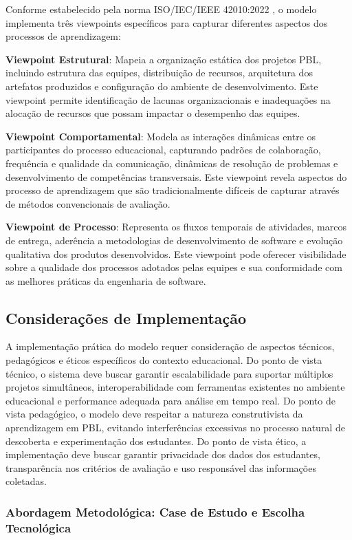 \documentclass[12pt,a4paper]{article}
\begin{document}
Conforme estabelecido pela norma ISO/IEC/IEEE 42010:2022 \cite{iso42010}, o modelo implementa três viewpoints específicos para capturar diferentes aspectos dos processos de aprendizagem:

\textbf{Viewpoint Estrutural}: Mapeia a organização estática dos projetos PBL, incluindo estrutura das equipes, distribuição de recursos, arquitetura dos artefatos produzidos e configuração do ambiente de desenvolvimento. Este viewpoint permite identificação de lacunas organizacionais e inadequações na alocação de recursos que possam impactar o desempenho das equipes.

\textbf{Viewpoint Comportamental}: Modela as interações dinâmicas entre os participantes do processo educacional, capturando padrões de colaboração, frequência e qualidade da comunicação, dinâmicas de resolução de problemas e desenvolvimento de competências transversais. Este viewpoint revela aspectos do processo de aprendizagem que são tradicionalmente difíceis de capturar através de métodos convencionais de avaliação.

\textbf{Viewpoint de Processo}: Representa os fluxos temporais de atividades, marcos de entrega, aderência a metodologias de desenvolvimento de software e evolução qualitativa dos produtos desenvolvidos. Este viewpoint pode oferecer visibilidade sobre a qualidade dos processos adotados pelas equipes e sua conformidade com as melhores práticas da engenharia de software.

\subsection{Considerações de Implementação}

A implementação prática do modelo requer consideração de aspectos técnicos, pedagógicos e éticos específicos do contexto educacional. Do ponto de vista técnico, o sistema deve buscar garantir escalabilidade para suportar múltiplos projetos simultâneos, interoperabilidade com ferramentas existentes no ambiente educacional e performance adequada para análise em tempo real. Do ponto de vista pedagógico, o modelo deve respeitar a natureza construtivista da aprendizagem em PBL, evitando interferências excessivas no processo natural de descoberta e experimentação dos estudantes. Do ponto de vista ético, a implementação deve buscar garantir privacidade dos dados dos estudantes, transparência nos critérios de avaliação e uso responsável das informações coletadas.

\subsubsection{Abordagem Metodológica: Case de Estudo e Escolha Tecnológica}
\end{document}
